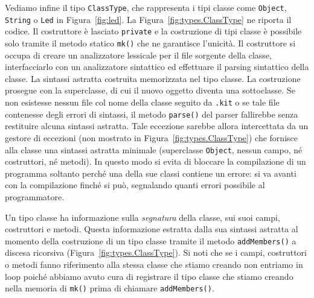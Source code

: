 Vediamo infine il tipo \texttt{ClassType}, che rappresenta i tipi
classe come \texttt{Object},
\texttt{String} o \texttt{Led} in Figura~\ref{fig:led}. La
Figura~\ref{fig:types.ClassType} ne riporta il codice. Il costruttore
\`e lasciato \texttt{private} e la costruzione di tipi classe \`e
possibile solo tramite il metodo statico \texttt{mk()} che ne garantisce
l'unicit\`a. Il costruttore si occupa di creare un analizzatore lessicale per
il file sorgente della classe, interfacciarlo con un analizzatore sintattico
ed effettuare il parsing sintattico della classe. La sintassi astratta \cosi
costruita \e memorizzata nel tipo classe. La costruzione prosegue con la
superclasse, di cui il nuovo oggetto diventa una sottoclasse.
Se non esistesse nessun file col nome della classe seguito
da \texttt{.kit} o se tale file contenesse degli errori di sintassi,
il metodo \texttt{parse()} del parser fallirebbe senza restituire alcuna
sintassi astratta. Tale eccezione sarebbe allora
intercettata da un gestore di eccezioni (non mostrato in
Figura~\ref{fig:types.ClassType}) che fornisce alla classe
una sintassi astratta minimale (superclasse \texttt{Object}, nessun
campo, n\'e costruttori, n\'e metodi). In questo modo si evita di
bloccare la compilazione di un programma soltanto perch\'e una della sue classi
contiene un errore: si va avanti con la compilazione
finch\'e si pu\`o, segnalando quanti \piu errori possibile al programmatore.

Un tipo classe ha informazione sulla \emph{segnatura}
della classe, \cioe sui suoi campi, costruttori e metodi.
Questa informazione \e estratta dalla sua sintassi astratta al momento
della costruzione di un tipo classe tramite il metodo
\texttt{addMembers()} a discesa ricorsiva
(Figura~\ref{fig:types.ClassType}). Si noti che se
i campi, costruttori o metodi fanno riferimento alla stessa classe che
stiamo creando non entriamo in loop poich\'e abbiamo avuto cura di
registrare il tipo classe che stiamo creando nella memoria di
\texttt{mk()} prima di chiamare \texttt{addMembers()}.

